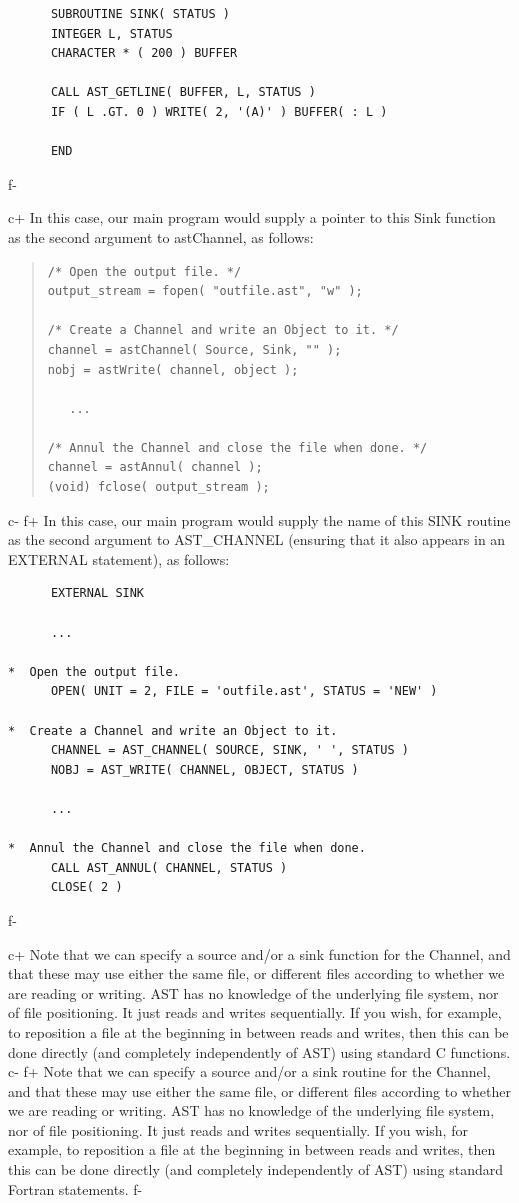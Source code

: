 \documentclass[twoside,11pt]{article}
\begin{document}
\small
\begin{verbatim}
      SUBROUTINE SINK( STATUS )
      INTEGER L, STATUS
      CHARACTER * ( 200 ) BUFFER

      CALL AST_GETLINE( BUFFER, L, STATUS )
      IF ( L .GT. 0 ) WRITE( 2, '(A)' ) BUFFER( : L )

      END
\end{verbatim}
\normalsize
f-

c+
In this case, our main program would supply a pointer to this Sink
function as the second argument to astChannel, as follows:

\begin{quote}
\small
\begin{verbatim}
/* Open the output file. */
output_stream = fopen( "outfile.ast", "w" );

/* Create a Channel and write an Object to it. */
channel = astChannel( Source, Sink, "" );
nobj = astWrite( channel, object );

   ...

/* Annul the Channel and close the file when done. */
channel = astAnnul( channel );
(void) fclose( output_stream );
\end{verbatim}
\normalsize
\end{quote}
c-
f+
In this case, our main program would supply the name of this SINK
routine as the second argument to AST\_CHANNEL (ensuring that it also
appears in an EXTERNAL statement), as follows:

\small
\begin{verbatim}
      EXTERNAL SINK

      ...

*  Open the output file.
      OPEN( UNIT = 2, FILE = 'outfile.ast', STATUS = 'NEW' )

*  Create a Channel and write an Object to it.
      CHANNEL = AST_CHANNEL( SOURCE, SINK, ' ', STATUS )
      NOBJ = AST_WRITE( CHANNEL, OBJECT, STATUS )

      ...

*  Annul the Channel and close the file when done.
      CALL AST_ANNUL( CHANNEL, STATUS )
      CLOSE( 2 )
\end{verbatim}
\normalsize
f-

c+
Note that we can specify a source and/or a sink function for the
Channel, and that these may use either the same file, or different
files according to whether we are reading or writing. AST has no
knowledge of the underlying file system, nor of file positioning. It
just reads and writes sequentially. If you wish, for example, to
reposition a file at the beginning in between reads and writes, then
this can be done directly (and completely independently of AST) using
standard C functions.
c-
f+
Note that we can specify a source and/or a sink routine for the
Channel, and that these may use either the same file, or different
files according to whether we are reading or writing. AST has no
knowledge of the underlying file system, nor of file positioning. It
just reads and writes sequentially. If you wish, for example, to
reposition a file at the beginning in between reads and writes, then
this can be done directly (and completely independently of AST) using
standard Fortran statements.
f-
\end{document}

